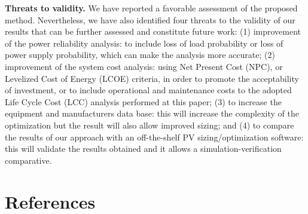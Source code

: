 \documentclass[review]{elsarticle}
\begin{document}
\textbf{Threats to validity.}  We have reported a favorable assessment of the proposed method. Nevertheless, we have also identified four threats to the validity of our results that can be further assessed and constitute future work: (1) improvement of the power reliability analysis: to include loss of load probability or loss of power supply probability, which can make the analysis more accurate; (2) improvement of the system cost analysis: using Net Present Cost (NPC), or Levelized Cost of Energy (LCOE) criteria, in order to promote the acceptability of investment, or to include operational and maintenance costs to the adopted Life Cycle Cost (LCC) analysis performed at this paper; (3) to increase the equipment and manufacturers data base: this will increase the complexity of the optimization but the result will also allow improved sizing; and (4) to compare the results of our approach with an off-the-shelf PV sizing/optimization software: this will validate the results obtained and it allows a simulation-verification comparative.
%
\section*{References}
{}
\end{document}
